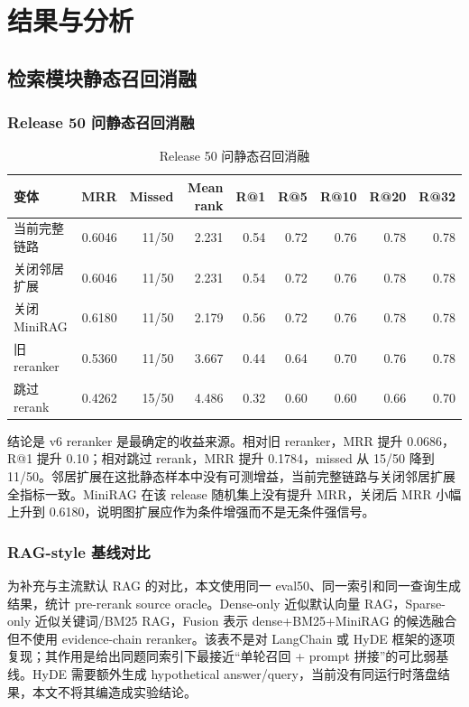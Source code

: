 \documentclass[UTF8,a4paper,12pt]{ctexart}
\begin{document}
\section{结果与分析}

\subsection{检索模块静态召回消融}

\subsubsection{Release 50 问静态召回消融}

\begin{table}[htbp]
\centering
\small
\begin{tabular}{lrrrrrrrr}
\toprule
变体 & MRR & Missed & Mean rank & R@1 & R@5 & R@10 & R@20 & R@32 \\
\midrule
当前完整链路 & 0.6046 & 11/50 & 2.231 & 0.54 & 0.72 & 0.76 & 0.78 & 0.78 \\
关闭邻居扩展 & 0.6046 & 11/50 & 2.231 & 0.54 & 0.72 & 0.76 & 0.78 & 0.78 \\
关闭 MiniRAG & 0.6180 & 11/50 & 2.179 & 0.56 & 0.72 & 0.76 & 0.78 & 0.78 \\
旧 reranker & 0.5360 & 11/50 & 3.667 & 0.44 & 0.64 & 0.70 & 0.76 & 0.78 \\
跳过 rerank & 0.4262 & 15/50 & 4.486 & 0.32 & 0.60 & 0.60 & 0.66 & 0.70 \\
\bottomrule
\end{tabular}
\caption{Release 50 问静态召回消融}
\end{table}

结论是 v6 reranker 是最确定的收益来源。相对旧 reranker，MRR 提升 0.0686，R@1 提升 0.10；相对跳过 rerank，MRR 提升 0.1784，missed 从 15/50 降到 11/50。邻居扩展在这批静态样本中没有可测增益，当前完整链路与关闭邻居扩展全指标一致。MiniRAG 在该 release 随机集上没有提升 MRR，关闭后 MRR 小幅上升到 0.6180，说明图扩展应作为条件增强而不是无条件强信号。

\subsubsection{RAG-style 基线对比}

为补充与主流默认 RAG 的对比，本文使用同一 eval50、同一索引和同一查询生成结果，统计 pre-rerank source oracle。Dense-only 近似默认向量 RAG，Sparse-only 近似关键词/BM25 RAG，Fusion 表示 dense+BM25+MiniRAG 的候选融合但不使用 evidence-chain reranker。该表不是对 LangChain 或 HyDE 框架的逐项复现；其作用是给出同题同索引下最接近“单轮召回 + prompt 拼接”的可比弱基线。HyDE 需要额外生成 hypothetical answer/query，当前没有同运行时落盘结果，本文不将其编造成实验结论。
\end{document}
